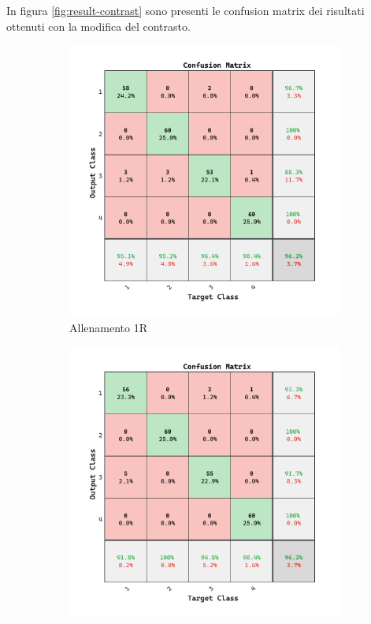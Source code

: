In figura \cref{fig:result-contrast} sono presenti le confusion matrix dei risultati ottenuti con la modifica del contrasto.

\begin{figure}[H]
    \centering
    \begin{subfigure}{0.49\textwidth}
        \includegraphics[width=\textwidth]{addestramento-rete-neurale/one-contrast.pdf}
        \caption{Allenamento 1R} 
    \end{subfigure}
    \begin{subfigure}{0.49\textwidth}
        \includegraphics[width=\textwidth]{addestramento-rete-neurale/two-contrast.pdf}

\end{subfigure}
\end{figure}
